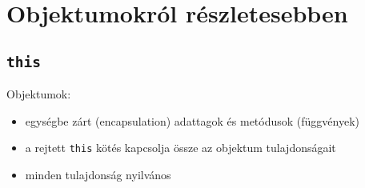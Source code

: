 \section{Objektumokról részletesebben}

\subsection{\texttt{this}}

\begin{frame}
    Objektumok: 
    \begin{itemize}
        \item egységbe zárt (encapsulation) adattagok és metódusok (függvények)
        \item a rejtett \texttt{this} kötés kapcsolja össze az objektum tulajdonságait
        \item minden tulajdonság nyilvános
    \end{itemize}
    \begin{exampleblock}{}
        \small
        
    \end{exampleblock}
\end{frame}

\begin{frame}
    \begin{exampleblock}{}
        \scriptsize
        
    \end{exampleblock}
\end{frame}

\begin{frame}
    \begin{exampleblock}{}
        \scriptsize
        
    \end{exampleblock}
\end{frame}

\begin{frame}
    \begin{exampleblock}{}
        \small
        
    \end{exampleblock}
\end{frame}

